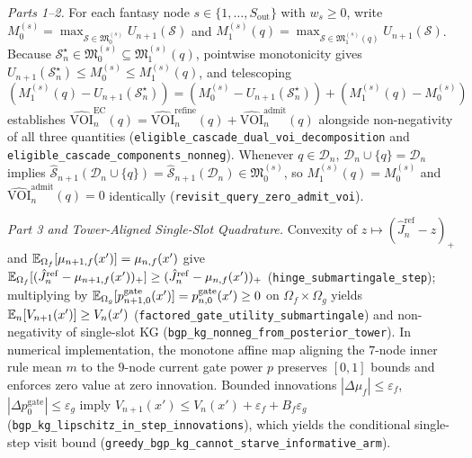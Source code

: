 \emph{Parts 1--2.} For each fantasy node $s \in \{1,\dots,S_{\mathrm{out}}\}$ with $w_s \ge 0$, write $M_0^{(s)} = \max_{\mathcal{S} \in \mathfrak{M}_0^{(s)}} U_{n+1}(\mathcal{S})$ and $M_1^{(s)}(q) = \max_{\mathcal{S} \in \mathfrak{M}_1^{(s)}(q)} U_{n+1}(\mathcal{S})$. Because $\mathcal{S}_n^\star \in \mathfrak{M}_0^{(s)} \subseteq \mathfrak{M}_1^{(s)}(q)$, pointwise monotonicity gives $U_{n+1}(\mathcal{S}_n^\star) \le M_0^{(s)} \le M_1^{(s)}(q)$, and telescoping $(M_1^{(s)}(q) - U_{n+1}(\mathcal{S}_n^\star)) = (M_0^{(s)} - U_{n+1}(\mathcal{S}_n^\star)) + (M_1^{(s)}(q) - M_0^{(s)})$ establishes $\widehat{\mathrm{VOI}}_n^{\mathrm{EC}}(q) = \widehat{\mathrm{VOI}}_n^{\mathrm{refine}}(q) + \widehat{\mathrm{VOI}}_n^{\mathrm{admit}}(q)$ alongside non-negativity of all three quantities (\texttt{eligible\_cascade\_dual\_voi\_decomposition} and \texttt{eligible\_cascade\_components\_nonneg}). Whenever $q \in \mathcal{D}_n$, $\mathcal{D}_n \cup \{q\} = \mathcal{D}_n$ implies $\hat{\mathcal{S}}_{n+1}(\mathcal{D}_n \cup \{q\}) = \hat{\mathcal{S}}_{n+1}(\mathcal{D}_n) \in \mathfrak{M}_0^{(s)}$, so $M_1^{(s)}(q) = M_0^{(s)}$ and $\widehat{\mathrm{VOI}}_n^{\mathrm{admit}}(q) = 0$ identically (\texttt{revisit\_query\_zero\_admit\_voi}).

\emph{Part 3 and Tower-Aligned Single-Slot Quadrature.} Convexity of $z \mapsto (\hat{J}_n^{\mathrm{ref}} - z)_+$ and $\mathbb{E}_{\Omega_f}[\mu_{n+1,f}(x')] = \mu_{n,f}(x')$ give $\mathbb{E}_{\Omega_f}[(\hat{J}_n^{\mathrm{ref}} - \mu_{n+1,f}(x'))_+] \ge (\hat{J}_n^{\mathrm{ref}} - \mu_{n,f}(x'))_+$ (\texttt{hinge\_submartingale\_step}); multiplying by $\mathbb{E}_{\Omega_g}[p_{n+1,0}^{\mathrm{gate}}(x')] = p_{n,0}^{\mathrm{gate}}(x') \ge 0$ on $\Omega_f \times \Omega_g$ yields $\mathbb{E}_n[V_{n+1}(x')] \ge V_n(x')$ (\texttt{factored\_gate\_utility\_submartingale}) and non-negativity of single-slot KG (\texttt{bgp\_kg\_nonneg\_from\_posterior\_tower}). In numerical implementation, the monotone affine map aligning the $7$-node inner rule mean $m$ to the $9$-node current gate power $p$ preserves $[0,1]$ bounds and enforces zero value at zero innovation. Bounded innovations $|\Delta\mu_f| \le \varepsilon_f$, $|\Delta p_0^{\mathrm{gate}}| \le \varepsilon_g$ imply $V_{n+1}(x') \le V_n(x') + \varepsilon_f + B_f\varepsilon_g$ (\texttt{bgp\_kg\_lipschitz\_in\_step\_innovations}), which yields the conditional single-step visit bound (\texttt{greedy\_bgp\_kg\_cannot\_starve\_informative\_arm}).
\Halmos\endproof

